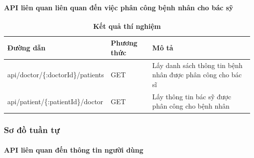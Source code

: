 \paragraph{API liên quan liên quan đến việc phân công bệnh nhân cho bác sỹ}
\mbox{}

\begin{table}[H]
  \centering
  \caption{\bfseries \fontsize{12pt}{0pt}\selectfont Kết quả thí nghiệm}
  \begin{tabularx}{0.9\textwidth}{
  | >{\raggedright\arraybackslash}X
  | >{\raggedright\arraybackslash}m{2cm}
  | >{\raggedright\arraybackslash}X|
  }
  \hline
  \bfseries Đường dẫn    &\bfseries Phương thức    &\bfseries Mô tả\\ \hline
   api/doctor/\{:doctorId\}/patients   &   GET  & Lấy danh sách thông tin bệnh nhân được phân công cho bác sĩ \\ \hline
  api/patient/\{:patientId\}/doctor  &    GET    & Lấy thông tin bác sỹ được phân công cho bệnh nhân \\ \hline

  \end{tabularx}
  \label{bang41}
\end{table}


\subsubsection{Sơ đồ tuần tự}


\paragraph{API liên quan đến thông tin người dùng}
\mbox{}


